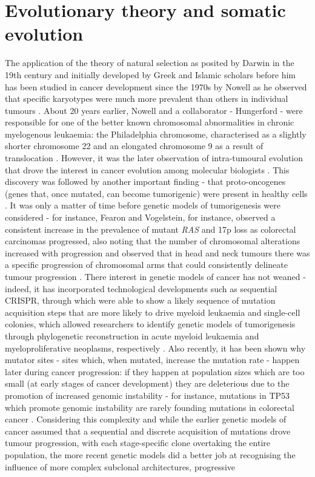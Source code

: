 \section{Evolutionary theory and somatic evolution}

The application of the theory of natural selection as posited by Darwin in the 19th century \cite{Darwin1859-yw} and initially developed by Greek and Islamic scholars before him \cite{noauthor_1898-xh,Zirkle1941-bw} has been studied in cancer development since the 1970s by Nowell as he observed that specific karyotypes were much more prevalent than others in individual tumours \cite{Nowell1976-ob}. About 20 years earlier, Nowell and a collaborator - Hungerford - were responsible for one of the better known chromosomal abnormalities in chronic myelogenous leukaemia: the Philadelphia chromosome, characterised as a slightly shorter chromosome 22 and an elongated chromosome 9 as a result of translocation \cite{Nowell2007-ux}. However, it was the later observation of intra-tumoural evolution that drove the interest in cancer evolution among molecular biologists \cite{Cannataro2018-ye}. This discovery was followed by another important finding - that proto-oncogenes (genes that, once mutated, can become tumorigenic) were present in healthy cells \cite{Stehelin1976-uu,Shih1982-gu}. It was only a matter of time before genetic models of tumorigenesis were considered - for instance, Fearon and Vogelstein, for instance, observed a consistent increase in the prevalence of mutant \textit{RAS} and 17p loss as colorectal carcinomas progressed, also noting that the number of chromosomal alterations increased with progression \cite{Fearon1990-rk} and  observed that in head and neck tumours there was a specific progression of chromosomal arms that could consistently delineate tumour progression \cite{Califano1996-kj}. There interest in genetic models of cancer has not weaned - indeed, it has incorporated technological developments such as sequential CRISPR, through which  were able to show a likely sequence of mutation acquisition steps that are more likely to drive myeloid leukaemia \cite{Wang2021-wg} and single-cell colonies, which allowed researchers to identify genetic models of tumorigenesis through phylogenetic reconstruction in acute myeloid leukaemia and myeloproliferative neoplasms, respectively \cite{Morita2020-rq,Williams2020-ji,Van_Egeren2021-tb}. Also recently, it has been shown why mutator sites - sites which, when mutated, increase the mutation rate - happen later during cancer progression: if they happen at population sizes which are too small (at early stages of cancer development) they are deleterious due to the promotion of increased genomic instability \cite{Raynes2018-hg} - for instance, mutations in TP53 which promote genomic instability are rarely founding mutations in colorectal cancer \cite{Kinzler1996-mp}. Considering this complexity and while the earlier genetic models of cancer assumed that a sequential and discrete acquisition of mutations drove tumour progression, with each stage-specific clone overtaking the entire population, the more recent genetic models did a better job at recognising the influence of more complex subclonal architectures, progressive 